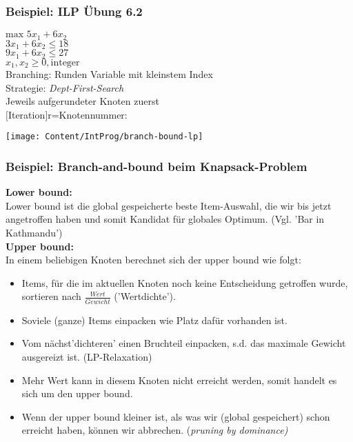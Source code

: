 \subsubsection{Beispiel: ILP Übung 6.2}
\begin{minipage}{6cm}
	$\text{max } 5x_1+6x_2$\\
	$3x_1 + 6x_2 \leqslant 18$\\
	$9x_1+6x_2 \leqslant 27$\\
	$x_1,x_2 \geqslant 0, \text{integer}$\\
	
	Branching: Runden Variable mit kleinstem Index\\
	Strategie: \textit{Dept-First-Search}\\
	Jeweils aufgerundeter Knoten zuerst\\
	$[$Iteration$]$r=Knotennummer:\\
\end{minipage}
\begin{minipage}{12cm}
	\texttt{[image: Content/IntProg/branch-bound-lp]}
\end{minipage}

\subsubsection{Beispiel: Branch-and-bound beim Knapsack-Problem }

\textbf{Lower bound:}\\
Lower bound ist die global gespeicherte beste Item-Auswahl, die wir bis jetzt angetroffen haben und somit Kandidat für globales Optimum. (Vgl. 'Bar in Kathmandu')\\

\textbf{Upper bound:}\\
In einem beliebigen Knoten berechnet sich der upper bound wie folgt:
\begin{itemize}
	\item Items, für die im aktuellen Knoten noch keine Entscheidung getroffen wurde, sortieren nach $\frac{Wert}{Gewicht}$ ('Wertdichte').
	\item Soviele (ganze) Items einpacken wie Platz dafür vorhanden ist.
	\item Vom nächst'dichteren' einen Bruchteil einpacken, s.d. das maximale Gewicht ausgereizt ist. (LP-Relaxation)
	\item Mehr Wert kann in diesem Knoten nicht erreicht werden, somit handelt es sich um den upper bound.
	\item Wenn der upper bound kleiner ist, als was wir (global gespeichert) schon erreicht haben, können wir abbrechen. (\em pruning by dominance\em)
\end{itemize}

